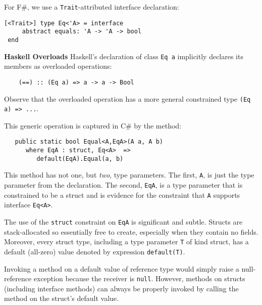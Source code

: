 \documentclass[9pt]{sig-alternate-05-2015}
\newif\ifclassic
\begin{document}
\ifclassic
For new F\# syntax we adopt the keyword \lstinline{concept} (\lstinline{class} is already taken):

\lstset{language={FSharp}}
\begin{lstlisting}
concept Eq 'a where 
    (==): 'a -> 'a -> bool
\end{lstlisting}
\else
For F\#, we use a  \lstinline{Trait}-attributed interface declaration:
\begin{lstlisting}
[<Trait>] type Eq<'A> = interface 
     abstract equals: 'A -> 'A -> bool 
 end
\end{lstlisting}
\fi
 
{\bf  Haskell Overloads} Haskell's declaration of class \lstinline{Eq a} implicitly declares its members as overloaded 
operations:

\begin{lstlisting}
    (==) :: (Eq a) => a -> a -> Bool 
\end{lstlisting}
Observe that the overloaded operation has a more general constrained type \lstinline{(Eq a) => ...}.

This generic operation is captured in C\# by the method:
\begin{lstlisting}
   public static bool Equal<A,EqA>(A a, A b) 
      where EqA : struct, Eq<A>  =>
         default(EqA).Equal(a, b)
\end{lstlisting}
This method has not one, but \emph{two}, type parameters. The first, \lstinline{A}, is just the type parameter from the declaration.
The second, \lstinline{EqA}, is a type parameter that is constrained to be a struct and is evidence for the constraint that \lstinline{A} supports interface \lstinline{Eq<A>}.

The use of the \lstinline{struct} constraint on \lstinline{EqA} is significant and subtle. Structs are stack-allocated so essentially free to create, especially when they contain no fields.
Moreover, every struct type, including a type parameter \lstinline{T} of kind struct, has a default (all-zero) value denoted by
 expression \lstinline{default(T)}.

Invoking a method on a default value of reference type would simply raise a null-reference exception because the receiver is \lstinline{null}.
However, methods on structs (including interface methods) can always be properly invoked
by calling the method on the struct's default value. 
\end{document}
